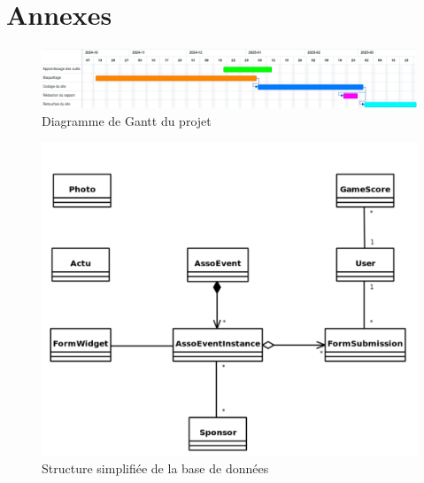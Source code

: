 \appendix
\renewcommand{\thefigure}{\Alph{figure}}

\chapter*{Annexes}

\begin{figure}[H]
    \centering
    \includegraphics[width=\textwidth]{assets/pictures/gantt.png}
    \caption{Diagramme de Gantt du projet}
    \label{anx:gantt}
\end{figure}

\begin{figure}[H]
    \centering
    \includegraphics[width=\textwidth]{assets/pictures/database.png}
    \caption{Structure simplifiée de la base de données}
    \label{anx:gantt}
\end{figure}
